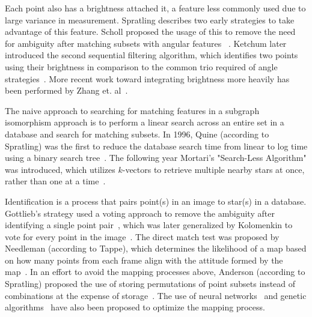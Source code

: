 
Each point also has a brightness attached it, a feature less commonly used due to large variance in measurement.
Spratling describes two early strategies to take advantage of this feature.
Scholl proposed the usage of this to remove the need for ambiguity after matching subsets with angular features ~\cite{scholl:starFieldIdentification}.
Ketchum later introduced the second sequential filtering algorithm, which identifies two points using their brightness in comparison to the common trio required of angle strategies~\cite{ketchum:onboardStarIdentification}.
More recent work toward integrating brightness more heavily has been performed by Zhang et. al~\cite{zhang:brightnessReferenced}.

The naive approach to searching for matching features in a subgraph isomorphism approach is to perform a linear search across an entire set in a database and search for matching subsets.
In 1996, Quine (according to Spratling) was the first to reduce the database search time from linear to log time using a binary search tree~\cite{quine:fastAutonomousStarAcquistion}.
The following year Mortari's "Search-Less Algorithm" was introduced, which utilizes $k$-vectors to retrieve multiple nearby stars at once, rather than one at a time~\cite{mortari:kVectorApproach}.

\newcommand{\srightarrow}{\! \rightarrow \!}
Identification is a process that pairs point(s) in an image to star(s) in a database.
Gottlieb's strategy used a voting approach to remove the ambiguity after identifying a single point pair~\cite{gottlieb:spacecraftAttitudeDetermination}, which was later generalized by Kolomenkin to vote for every point in the image~\cite{kolomenkin:geometricVoting}.
The direct match test was proposed by Needleman (according to Tappe), which determines the likelihood of a map based on how many points from each frame align with the attitude formed by the map~\cite{needelman:stellarAttitudeAcquisition}.
In an effort to avoid the mapping processes above, Anderson (according to Spratling) proposed the use of storing permutations of point subsets instead of combinations at the expense of storage~\cite{anderson:autonomousStarSensing}.
The use of neural networks~\cite{lindsey:neuralNetworkMethods,alvelda:neuralNetworkStar} and genetic algorithms~\cite{paladugu:geneticAlgorithms} have also been proposed to optimize the mapping process.
